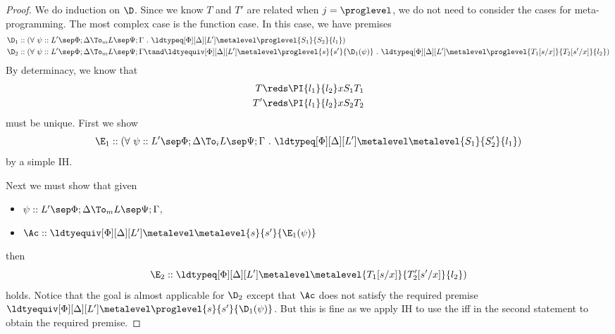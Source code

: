 \begin{proof}
  We do induction on $\D$. %
  Since we know $T$ and $T'$ are related when $j = \proglevel$, we do not need to consider the
  cases for meta-programming. %
  The most complex case is the function case. %
  In this case, we have premises
  \begin{align*}
    \D_1 &:: (\forall~ \psi :: L' \sep \Phi;\Delta \To_m L \sep \Psi; \Gamma ~.~
           \ldtypeq[\Phi][\Delta][L'] \metalevel \proglevel{S_1}{S_2}{l_1}) \\
    \D_2 &:: (\forall~ \psi :: L' \sep \Phi;\Delta \To_m L \sep \Psi; \Gamma \tand \ldtyequiv[\Phi][\Delta][L']
           \metalevel \proglevel {s}{s'}{\D_1(\psi)} ~.~
           \ldtypeq[\Phi][\Delta][L'] \metalevel \proglevel{T_1[s/x]}{T_2[s'/x]}{l_2})
  \end{align*}
  By determinacy, we know that
  \begin{align*}
    T \reds \PI{l_1}{l_2} x{S_1}{T_1} \\
    T' \reds \PI{l_1}{l_2} x{S_2}{T_2}
  \end{align*}
  must be unique.  %
  First we show
  \[
    \E_1 :: (\forall~ \psi :: L' \sep \Phi;\Delta \To_i L \sep \Psi; \Gamma ~.~
    \ldtypeq[\Phi][\Delta][L'] \metalevel \metalevel{S_1}{S_2'}{l_1})
  \]
  by a simple IH.

  Next we must show that given
  \begin{itemize}
  \item $\psi :: L' \sep \Phi;\Delta \To_m L \sep \Psi; \Gamma$,    
  \item $\Ac :: \ldtyequiv[\Phi][\Delta][L'] \metalevel \metalevel {s}{s'}{\E_1(\psi)}$
  \end{itemize}
  then
  \[
    \E_2 :: \ldtypeq[\Phi][\Delta][L'] \metalevel \metalevel{T_1[s/x]}{T_2'[s'/x]}{l_2})
  \]
  holds. %
  Notice that the goal is almost applicable for $\D_2$ except that $\Ac$ does not
  satisfy the required premise $\ldtyequiv[\Phi][\Delta][L'] \metalevel \proglevel
  {s}{s'}{\D_1(\psi)}$. %
  But this is fine as we apply IH to use the iff in the second statement to obtain the
  required premise. %


\end{proof}
